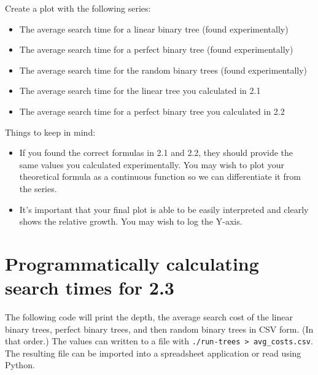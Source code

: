 \documentclass{article}
\begin{document}
\bigskip
\noindent Create a plot with the following series:
\begin{itemize}
    \item The average search time for a linear binary tree (found experimentally)
    \item The average search time for a perfect binary tree (found experimentally)
    \item The average search time for the random binary trees (found experimentally)
    \item The average search time for the linear tree you calculated in 2.1
    \item The average search time for a perfect binary tree you calculated in 2.2
\end{itemize}

\bigskip

\noindent Things to keep in mind:
\begin{itemize}
    \item If you found the correct formulas in 2.1 and 2.2, they should provide the same values you calculated experimentally. You may wish to plot your theoretical formula as a continuous function so we can differentiate it from the series.
    \item It's important that your final plot is able to be easily interpreted and clearly shows the relative growth. You may wish to log the Y-axis.
\end{itemize}

\newpage

\section*{Programmatically calculating search times for 2.3}

The following code will print the depth, the average search cost of the linear binary trees, perfect binary trees, and then random binary trees in CSV form. (In that order.) The values can written to a file with \verb|./run-trees > avg_costs.csv|. The resulting file can be imported into a spreadsheet application or read using Python.
\end{document}
